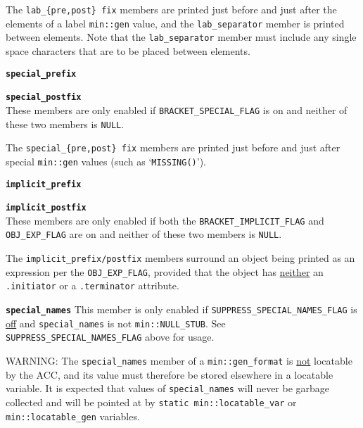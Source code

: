 \documentclass[12pt]{article}
\makeatletter
\newcommand{\TT}[1]{{\tt \bfseries #1}}
\newcommand{\ttmkey}[2]{\TT{#1}\index{#1@{\tt #1}!#2}}
\newcommand{\EOL}{\penalty \exhyphenpenalty}
\newenvironment{itemlist}[1][1.2in]%
	{\begin{list}{}{\setlength{\labelwidth}{#1}%
		        \setlength{\leftmargin}{\labelwidth}%
		        \addtolength{\leftmargin}{+0.2in}%
		        \renewcommand{\makelabel}[1]{##1\hfill}}}%
	{\end{list}}
\makeatother
\begin{document}
\begin{itemlist}[0.4in]
The {\tt lab\_\EOL \{pre,post\} fix} members are printed just before and
just after the elements of a label {\tt min::gen} value,
and the {\tt lab\_\EOL separa\-tor} member
is printed between elements.  Note that the {\tt lab\_\EOL sep\-ara\-tor}
member must include any single space characters that are to be placed between
elements.

\item[\ttmkey{special\_prefix}{in {\tt min::gen\_format}}]
\item[\ttmkey{special\_postfix}{in {\tt min::gen\_format}}]\vspace{-2ex}~\\
These members are only enabled if {\tt BRACKET\_\EOL SPECIAL\_\EOL FLAG} is on
and neither of these two members is {\tt NULL}.

The {\tt special\_\EOL \{pre,post\} fix}
members are printed just before and
just after special {\tt min::gen} values (such as `{\tt MISSING()}').

\item[\ttmkey{implicit\_prefix}{in {\tt min::gen\_format}}]
\item[\ttmkey{implicit\_postfix}{in {\tt min::gen\_format}}]\vspace{-2ex}~\\
These members are only enabled if both the
{\tt BRACKET\_\EOL IMPLICIT\_\EOL FLAG} and {\tt OBJ\_\EOL EXP\_\EOL FLAG}
are on and neither of these two members is {\tt NULL}.

The {\tt implicit\_\EOL prefix/postfix} members surround an object being
printed as an expression per the {\tt OBJ\_\EOL EXP\_\EOL FLAG}, provided that
the object has \underline{neither}
an {\tt .initia\-tor} or a {\tt .ter\-min\-ator} attribute.

\item[\ttmkey{special\_names}{in {\tt min::gen\_format}}]
This member is only enabled if
{\tt SUPPRESS\_\EOL SPECIAL\_\EOL NAMES\_\EOL FLAG} is \underline{off}
and {\tt spec\-ial\_\EOL names} is not {\tt min::\EOL NULL\_\EOL STUB}.
See
{\tt SUPPRESS\_\EOL SPECIAL\_\EOL NAMES\_\EOL FLAG} above for usage.

WARNING: The {\tt special\_\EOL names} member of a {\tt min::gen\_format} is
\underline{not} locatable by the ACC, and its value must therefore be
stored elsewhere in a locatable variable.  It is expected that values of
{\tt special\_\EOL names} will never be garbage collected and
will be pointed at by {\tt static min::\EOL locatable\_\EOL var} or
{\tt min::\EOL locatable\_\EOL gen} variables.


\end{itemlist}
\end{document}
